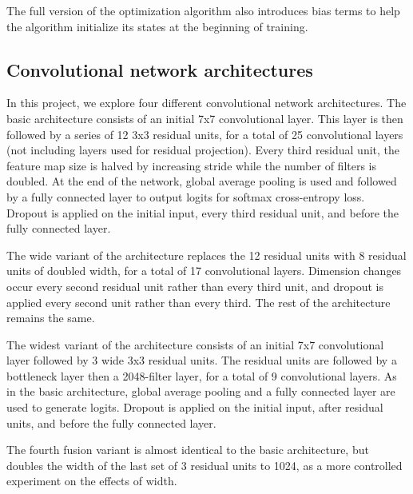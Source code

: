 \documentclass[10pt,twocolumn,letterpaper]{article}
\begin{document}
The full version of the optimization algorithm also introduces bias terms to help the algorithm initialize its states at the beginning of training.

\subsection{Convolutional network architectures}
In this project, we explore four different convolutional network architectures. The basic architecture consists of an initial 7x7 convolutional layer. This layer is then followed by a series of 12 3x3 residual units, for a total of 25 convolutional layers (not including layers used for residual projection). Every third residual unit, the feature map size is halved by increasing stride while the number of filters is doubled. At the end of the network, global average pooling is used and followed by a fully connected layer to output logits for softmax cross-entropy loss. Dropout is applied on the initial input, every third residual unit, and before the fully connected layer.

The wide variant of the architecture replaces the 12 residual units with 8 residual units of doubled width, for a total of 17 convolutional layers. Dimension changes occur every second residual unit rather than every third unit, and dropout is applied every second unit rather than every third. The rest of the architecture remains the same.

The widest variant of the architecture consists of an initial 7x7 convolutional layer followed by 3 wide 3x3 residual units. The residual units are followed by a bottleneck layer then a 2048-filter layer, for a total of 9 convolutional layers. As in the basic architecture, global average pooling and a fully connected layer are used to generate logits. Dropout is applied on the initial input, after residual units, and before the fully connected layer.

The fourth fusion variant is almost identical to the basic architecture, but doubles the width of the last set of 3 residual units to 1024, as a more controlled experiment on the effects of width.
\end{document}

